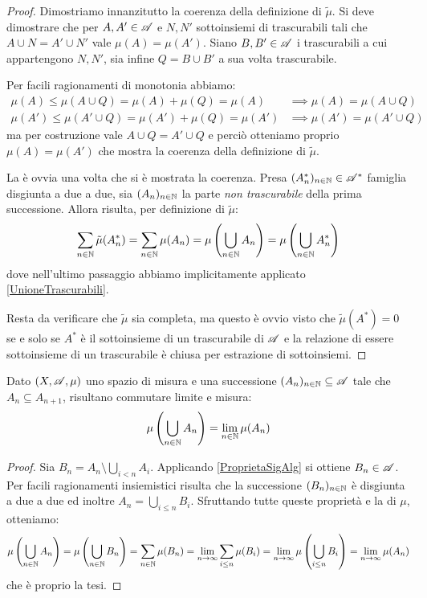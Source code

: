 \begin{proof}
	Dimostriamo innanzitutto la coerenza della definizione di $\tilde\mu$. Si deve dimostrare che per $A,A'\in\mathscr A$ e $N,N'$ sottoinsiemi di trascurabili tali che $A\cup N=A'\cup N'$ vale $\mu(A)=\mu(A')$. Siano $B,B'\in\mathscr A$ i trascurabili a cui appartengono $N,N'$, sia infine $Q=B\cup B'$ a sua volta trascurabile.
	
	Per facili ragionamenti di monotonia abbiamo:
	\begin{align*}
		\mu(A)\le \mu(A\cup Q) =\mu(A)+\mu(Q)=\mu(A) &\implies \mu(A)=\mu(A\cup Q)\\
		\mu(A')\le \mu(A'\cup Q) =\mu(A')+\mu(Q)=\mu(A') &\implies \mu(A')=\mu(A'\cup Q)
	\end{align*}
	ma per costruzione vale $A\cup Q=A'\cup Q$ e perciò otteniamo proprio $\mu(A)=\mu(A')$ che mostra la coerenza della definizione di $\tilde\mu$.
	
	La \sigadd[ità] è ovvia una volta che si è mostrata la coerenza. Presa $(A^*_n)_{n\in\mathbb N}\in\mathscr A^*$ famiglia disgiunta a due a due, sia $(A_n)_{n\in\mathbb N}$ la parte \emph{non trascurabile} della prima successione. Allora risulta, per definizione di $\tilde\mu$:
	\begin{equation*}
		\sum_{n\in\mathbb N} \tilde\mu(A^*_n)=\sum_{n\in\mathbb N} \mu(A_n)=\mu\left(\bigcup_{n\in\mathbb N} A_n\right)=\mu\left(\bigcup_{n\in\mathbb N} A^*_n\right)
	\end{equation*}
	dove nell'ultimo passaggio abbiamo implicitamente applicato \cref{UnioneTrascurabili}.
	
	Resta da verificare che $\tilde\mu$ sia completa, ma questo è ovvio visto che  $\tilde\mu(A^*)=0$ se e solo se $A^*$ è il sottoinsieme di un trascurabile di $\mathscr A$ e la relazione di essere sottoinsieme di un trascurabile è chiusa per estrazione di sottoinsiemi. 

\end{proof}



\begin{proposition}\label{LimiteMonotonoCrescenteMisura}
	Dato $(X,\mathscr A,\mu)$ uno spazio di misura e una successione $(A_n)_{n\in\mathbb N}\subseteq \mathscr A$ tale che $A_n\subseteq A_{n+1}$, risultano commutare limite e misura:
	\begin{equation*}
		\mu\left(\bigcup_{n\in\mathbb N} A_n\right)=\lim_{n\in\mathbb N} \mu(A_n)
	\end{equation*}
\end{proposition}
\begin{proof}
	Sia $B_n=A_n\setminus\bigcup_{i<n}A_i$. Applicando \cref{ProprietaSigAlg} si ottiene $B_n\in\mathscr A$.
	Per facili ragionamenti insiemistici risulta che la successione $(B_n)_{n\in\mathbb N}$ è disgiunta a due a due ed inoltre $A_n=\bigcup_{i\le n}B_i$.
	Sfruttando tutte queste proprietà e la \sigadd[ità] di $\mu$, otteniamo:
	\begin{equation*}
		\mu\left(\bigcup_{n\in\mathbb N} A_n\right)=\mu\left(\bigcup_{n\in\mathbb N} B_n\right)=
		\sum_{n\in\mathbb N} \mu(B_n)=\lim_{n\to\infty} \sum_{i\le n} \mu(B_i)=
		\lim_{n\to\infty} \mu\left(\bigcup_{i\le n} B_i\right)=\lim_{n\to\infty} \mu(A_n)
	\end{equation*}
	che è proprio la tesi.
\end{proof}

